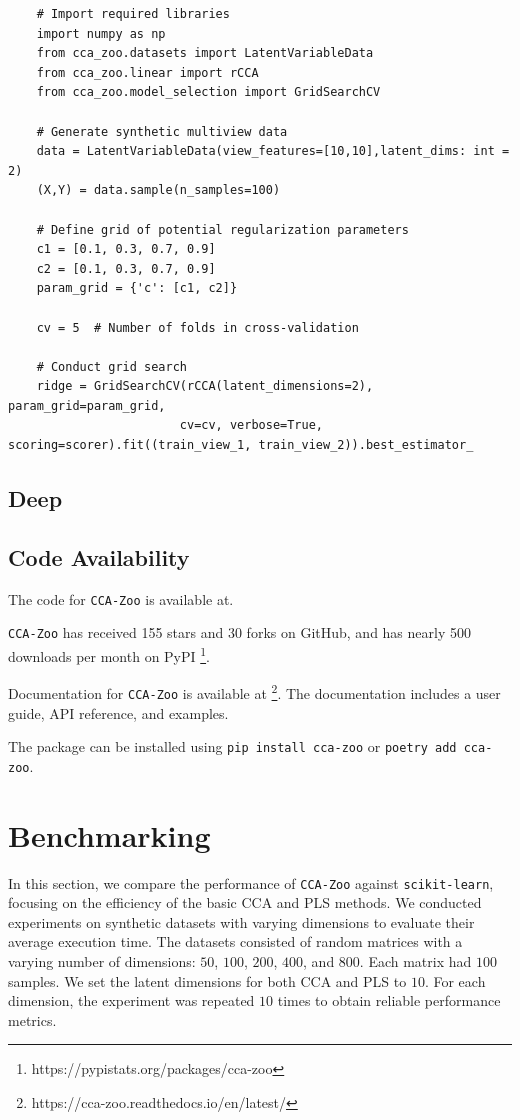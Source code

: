 \begin{verbatim}
    # Import required libraries
    import numpy as np
    from cca_zoo.datasets import LatentVariableData
    from cca_zoo.linear import rCCA
    from cca_zoo.model_selection import GridSearchCV
    
    # Generate synthetic multiview data
    data = LatentVariableData(view_features=[10,10],latent_dims: int = 2)
    (X,Y) = data.sample(n_samples=100)

    # Define grid of potential regularization parameters
    c1 = [0.1, 0.3, 0.7, 0.9]
    c2 = [0.1, 0.3, 0.7, 0.9]
    param_grid = {'c': [c1, c2]}

    cv = 5  # Number of folds in cross-validation

    # Conduct grid search
    ridge = GridSearchCV(rCCA(latent_dimensions=2), param_grid=param_grid,
                        cv=cv, verbose=True, scoring=scorer).fit((train_view_1, train_view_2)).best_estimator_
    \end{verbatim}
\subsection{Deep}


\subsection{Code Availability}

The code for \texttt{CCA-Zoo} is available at.

\texttt{CCA-Zoo} has received 155 stars and 30 forks on GitHub, and has nearly 500 downloads per month on PyPI \footnote{https://pypistats.org/packages/cca-zoo}.

Documentation for \texttt{CCA-Zoo} is available at \footnote{https://cca-zoo.readthedocs.io/en/latest/}.
The documentation includes a user guide, API reference, and examples.

The package can be installed using \texttt{pip install cca-zoo} or \texttt{poetry add cca-zoo}.



\section{Benchmarking}

In this section, we compare the performance of \texttt{CCA-Zoo} against \texttt{scikit-learn}, focusing on the efficiency of the basic CCA and PLS methods.
We conducted experiments on synthetic datasets with varying dimensions to evaluate their average execution time.
The datasets consisted of random matrices with a varying number of dimensions: \(50\), \(100\), \(200\), \(400\), and \(800\). Each matrix had \(100\) samples. We set the latent dimensions for both CCA and PLS to \(10\). For each dimension, the experiment was repeated \(10\) times to obtain reliable performance metrics.

